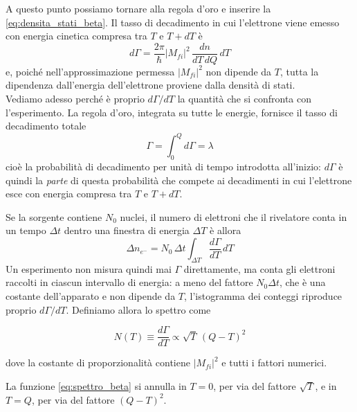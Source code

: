 A questo punto possiamo tornare alla regola d'oro e inserire la \eqref{eq:densita_stati_beta}. Il tasso di decadimento in cui l'elettrone viene emesso con energia cinetica compresa tra $T$ e $T+dT$ è 
%
\begin{equation}
    d\Gamma = \frac{2\pi}{\hbar} |M_{fi}|^2 \, \frac{d n}{dT \, dQ} \, dT
\end{equation}
e, poiché nell'approssimazione permessa $|M_{fi}|^2$ non dipende da $T$, tutta la dipendenza dall'energia dell'elettrone proviene dalla densità di stati.\\

Vediamo adesso perché è proprio $d\Gamma/dT$ la quantità che si confronta con l'esperimento. La regola d'oro, integrata su tutte le energie, fornisce il tasso di decadimento totale
%
\begin{equation}
    \Gamma = \int_0^{Q} d\Gamma = \lambda
\end{equation}
cioè la probabilità di decadimento per unità di tempo introdotta all'inizio: $d\Gamma$ è quindi la \emph{parte} di questa probabilità che compete ai decadimenti in cui l'elettrone esce con energia compresa tra $T$ e $T + dT$. 

Se la sorgente contiene $N_0$ nuclei, il numero di elettroni che il rivelatore conta in un tempo $\Delta t$ dentro una finestra di energia $\Delta T$ è allora
%
\begin{equation*}
    \Delta n_{e^-} = N_0 \, \Delta t \int_{\Delta T} \frac{d\Gamma}{dT} \, dT
\end{equation*}
Un esperimento non misura quindi mai $\Gamma$ direttamente, ma conta gli elettroni raccolti in ciascun intervallo di energia: a meno del fattore $N_0 \Delta t$, che è una costante dell'apparato e non dipende da $T$, l'istogramma dei conteggi riproduce proprio $d\Gamma/dT$. Definiamo allora lo spettro come
%
\begin{tcolorbox}[colback=black!5!white, colframe=black!45!white, boxrule=0.8pt]
\begin{equation}
    N(T) \equiv \frac{d\Gamma}{dT} \propto \sqrt{T} \, (Q - T)^2
    \label{eq:spettro_beta}
\end{equation}
\end{tcolorbox}
dove la costante di proporzionalità contiene $|M_{fi}|^2$ e tutti i fattori numerici. 

\newpage

La funzione \eqref{eq:spettro_beta} si annulla in $T = 0$, per via del fattore $\sqrt{T}$, e in $T = Q$, per via del fattore $(Q-T)^2$.

